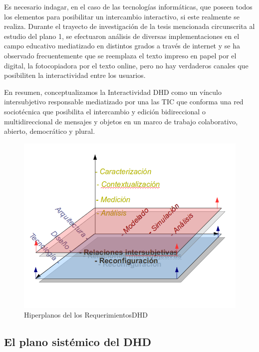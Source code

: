 Es necesario indagar, en el caso de las tecnologías informáticas, que
poseen todos los elementos para posibilitar un intercambio interactivo, si este
realmente se realiza. Durante el trayecto de investigación de la tesis mencionada
circunscrita al estudio del plano 1, se efectuaron análisis de diversas
implementaciones en el campo educativo mediatizado en distintos grados a través de internet y se ha
observado frecuentemente que se reemplaza el texto
impreso en papel por el digital, la fotocopiadora por el texto online, pero no
hay verdaderos canales que posibiliten la interactividad entre los usuarios.


\begin{defi}  En resumen, conceptualizamos la Interactividad DHD
como un vínculo intersubjetivo responsable mediatizado por una las TIC que conforma una red sociotécnica que posibilita el
intercambio y edición bidireccional o multidireccional de mensajes y objetos en un marco de trabajo
colaborativo, abierto, democrático y plural.
\end{defi} 


\begin{figure}
\begin{center}
 \includegraphics[width=4 in,totalheight=3 in] {DHD/hiperplanosDHD}
\caption{Hiperplanos del los RequerimientosDHD} \label{hiperplanos}
\end{center}
\end{figure}


\subsection{El plano sistémico del DHD}


